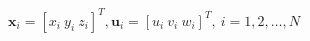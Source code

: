 \documentclass[preview]{standalone}
\begin{document}
\begin{align*}
\mathbf{x}_i = [x_i \ y_i \ z_i]^T, \mathbf{u}_i = [u_i \ v_i \ w_i]^T, \ i = 1,2,\dots,N
\end{align*}
\end{document}
